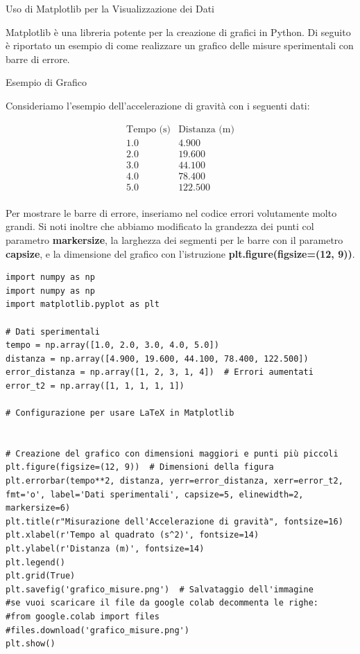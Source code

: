 \documentclass[12pt,a4paper,oneside]{book}
\makeatletter
\renewcommand{\section}{\@startsection{section}{1}{\z@}
{-4ex \@plus -1ex \@minus -.4ex}
{1ex \@plus.2ex }
{\normalfont\large\sffamily\bfseries}}
\renewcommand{\subsection}{\@startsection {subsection}{2}{\z@}
{-3ex \@plus -0.1ex \@minus -.4ex}
{0.5ex \@plus.2ex }
{\color[rgb]{0.141,0.596,0.749}\normalfont\sffamily\bfseries}}
\theoremstyle{esercizio}
\makeatother
\begin{document}
\section{Uso di Matplotlib per la Visualizzazione dei Dati}

Matplotlib è una libreria potente per la creazione di grafici in Python. Di seguito è riportato un esempio di come realizzare un grafico delle misure sperimentali con barre di errore.

\subsection{Esempio di Grafico}

Consideriamo l'esempio dell'accelerazione di gravità con i seguenti dati:

\[
\begin{array}{c|c}
\text{Tempo (s)} & \text{Distanza (m)} \\
\hline
1.0 & 4.900 \\
2.0 & 19.600 \\
3.0 & 44.100 \\
4.0 & 78.400 \\
5.0 & 122.500 \\
\end{array}
\]

Per mostrare le barre di errore, inseriamo nel codice errori volutamente molto grandi. Si noti inoltre che abbiamo modificato la grandezza dei punti col parametro \textbf{markersize}, la larghezza dei segmenti per le barre con il parametro \textbf{capsize}, e la dimensione del grafico con l'istruzione \textbf{plt.figure(figsize=(12, 9))}.

\begin{lstlisting}[caption={Grafico delle misure sperimentali con barre di errore}]
import numpy as np
import numpy as np
import matplotlib.pyplot as plt

# Dati sperimentali
tempo = np.array([1.0, 2.0, 3.0, 4.0, 5.0])
distanza = np.array([4.900, 19.600, 44.100, 78.400, 122.500])
error_distanza = np.array([1, 2, 3, 1, 4])  # Errori aumentati
error_t2 = np.array([1, 1, 1, 1, 1])

# Configurazione per usare LaTeX in Matplotlib


# Creazione del grafico con dimensioni maggiori e punti più piccoli
plt.figure(figsize=(12, 9))  # Dimensioni della figura
plt.errorbar(tempo**2, distanza, yerr=error_distanza, xerr=error_t2, fmt='o', label='Dati sperimentali', capsize=5, elinewidth=2, markersize=6)
plt.title(r"Misurazione dell'Accelerazione di gravità", fontsize=16)
plt.xlabel(r'Tempo al quadrato (s^2)', fontsize=14)
plt.ylabel(r'Distanza (m)', fontsize=14)
plt.legend()
plt.grid(True)
plt.savefig('grafico_misure.png')  # Salvataggio dell'immagine
#se vuoi scaricare il file da google colab decommenta le righe:
#from google.colab import files
#files.download('grafico_misure.png')
plt.show()



\end{lstlisting}
\end{document}
